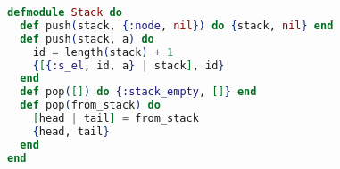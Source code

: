 \begin{lstlisting}[language=Elixir, caption=Simple LIFO stack]
defmodule Stack do
  def push(stack, {:node, nil}) do {stack, nil} end
  def push(stack, a) do
    id = length(stack) + 1
    {[{:s_el, id, a} | stack], id}
  end
  def pop([]) do {:stack_empty, []} end
  def pop(from_stack) do
    [head | tail] = from_stack
    {head, tail}
  end
end
\end{lstlisting}